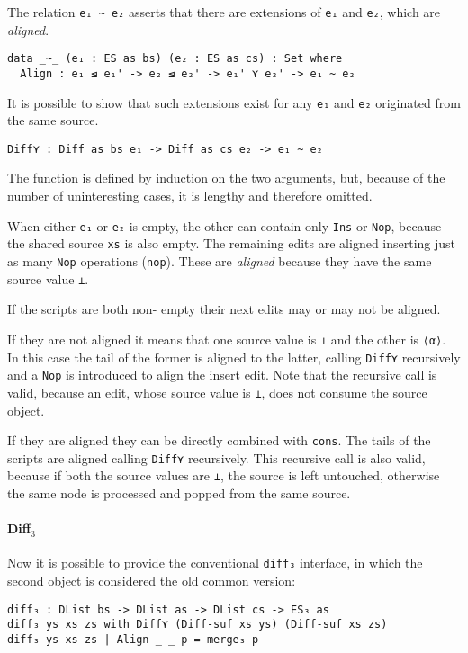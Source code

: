 \documentclass[../Thesis.tex]{subfiles}
\begin{document}
	The relation \texttt{e₁ \textasciitilde\ e₂} asserts that there are
	extensions of \texttt{e₁} and \texttt{e₂}, which are \emph{aligned}.
	
\begin{verbatim}
data _~_ (e₁ : ES as bs) (e₂ : ES as cs) : Set where
  Align : e₁ ⊴ e₁' -> e₂ ⊴ e₂' -> e₁' ⋎ e₂' -> e₁ ~ e₂
\end{verbatim}
	
	It is possible to show that such extensions exist for any \texttt{e₁} 
	and \texttt{e₂} 	originated from the same source. 
	
\begin{verbatim}
Diff⋎ : Diff as bs e₁ -> Diff as cs e₂ -> e₁ ~ e₂
\end{verbatim}
	The function is defined by induction on the two arguments,
	but, because of the number of uninteresting cases, it is lengthy 
	and therefore omitted.

	When either \texttt{e₁} or \texttt{e₂} is empty, the other can contain
	only \texttt{Ins} or \texttt{Nop}, because the shared source \texttt{xs} is
	also empty. The remaining edits are aligned
	inserting just as many \texttt{Nop} operations (\texttt{nop}). 
	These are \emph{aligned} because they have the same source value 
	\texttt{⊥}.
	
	If the scripts are both non-	empty their next edits may or may not
	be aligned. 
	
	If they are not aligned it means that one source
	value is \texttt{⊥} and the other is \texttt{⟨α⟩}. In this case
	the tail of the former is aligned to the latter, calling \texttt{Diff⋎} 
	recursively and a \texttt{Nop} is introduced to align the insert edit.
	Note that the recursive call is valid, because an edit, whose
	source value is \texttt{⊥}, does not consume the source object.

	If they are aligned they can be directly combined with \texttt{cons}.
	The tails of the scripts are aligned calling \texttt{Diff⋎} recursively.
	This recursive call is also valid, because if both the source values are
	\texttt{⊥}, the source is left untouched, otherwise the same node
	is processed and popped from the same source.	

	\paragraph{Diff$_3$}
	Now it is possible to provide the conventional \texttt{diff₃} interface, in
	which the second object is considered the old common version:
\begin{verbatim}
diff₃ : DList bs -> DList as -> DList cs -> ES₃ as
diff₃ ys xs zs with Diff⋎ (Diff-suf xs ys) (Diff-suf xs zs)
diff₃ ys xs zs | Align _ _ p = merge₃ p
\end{verbatim}
	
\end{document}
